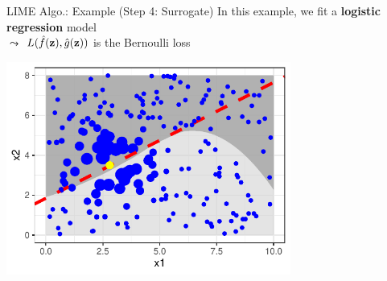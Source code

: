 \documentclass[10pt,compress,t,notes=noshow, xcolor=table]{beamer}
\newcommand{\gh}{\hat{g}}
\begin{document}
\begin{frame}{LIME Algo.: Example (Step 4: Surrogate)}
		In this example, we fit a \textbf{logistic regression} model\\
        $\leadsto$ $L(\fh(\zv), \gh(\zv))$ is the Bernoulli loss
		\begin{center}
			\includegraphics[width=0.7\textwidth]{figure/lime5}
		\end{center}
\end{frame}

\endlecture
\end{document}
